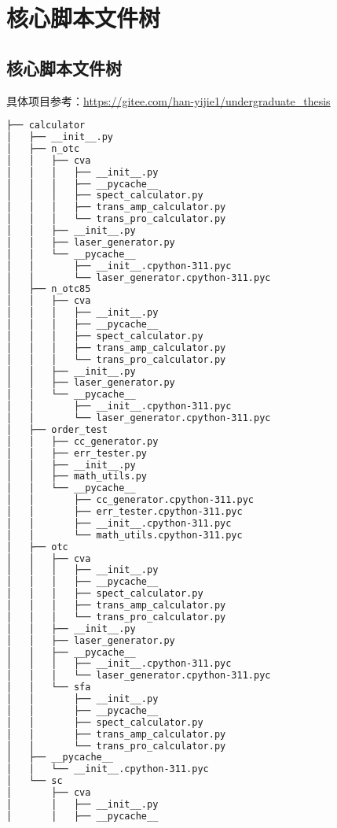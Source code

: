 
\thesisappendix

\chapter{核心脚本文件树}
\section{核心脚本文件树}\label{app:tree}

具体项目参考：\url{https://gitee.com/han-yijie1/undergraduate_thesis}

\begin{lstlisting}[language=bash, caption={files tree}, label={code:tree_script},
	    extendedchars=true,  % 允许扩展字符集
		inputencoding=utf8x,  % 显式声明UTF-8输入
	]
├── calculator
│   ├── __init__.py
│   ├── n_otc
│   │   ├── cva
│   │   │   ├── __init__.py
│   │   │   ├── __pycache__
│   │   │   ├── spect_calculator.py
│   │   │   ├── trans_amp_calculator.py
│   │   │   └── trans_pro_calculator.py
│   │   ├── __init__.py
│   │   ├── laser_generator.py
│   │   └── __pycache__
│   │       ├── __init__.cpython-311.pyc
│   │       └── laser_generator.cpython-311.pyc
│   ├── n_otc85
│   │   ├── cva
│   │   │   ├── __init__.py
│   │   │   ├── __pycache__
│   │   │   ├── spect_calculator.py
│   │   │   ├── trans_amp_calculator.py
│   │   │   └── trans_pro_calculator.py
│   │   ├── __init__.py
│   │   ├── laser_generator.py
│   │   └── __pycache__
│   │       ├── __init__.cpython-311.pyc
│   │       └── laser_generator.cpython-311.pyc
│   ├── order_test
│   │   ├── cc_generator.py
│   │   ├── err_tester.py
│   │   ├── __init__.py
│   │   ├── math_utils.py
│   │   └── __pycache__
│   │       ├── cc_generator.cpython-311.pyc
│   │       ├── err_tester.cpython-311.pyc
│   │       ├── __init__.cpython-311.pyc
│   │       └── math_utils.cpython-311.pyc
│   ├── otc
│   │   ├── cva
│   │   │   ├── __init__.py
│   │   │   ├── __pycache__
│   │   │   ├── spect_calculator.py
│   │   │   ├── trans_amp_calculator.py
│   │   │   └── trans_pro_calculator.py
│   │   ├── __init__.py
│   │   ├── laser_generator.py
│   │   ├── __pycache__
│   │   │   ├── __init__.cpython-311.pyc
│   │   │   └── laser_generator.cpython-311.pyc
│   │   └── sfa
│   │       ├── __init__.py
│   │       ├── __pycache__
│   │       ├── spect_calculator.py
│   │       ├── trans_amp_calculator.py
│   │       └── trans_pro_calculator.py
│   ├── __pycache__
│   │   └── __init__.cpython-311.pyc
│   └── sc
│       ├── cva
│       │   ├── __init__.py
│       │   ├── __pycache__

\end{lstlisting}
